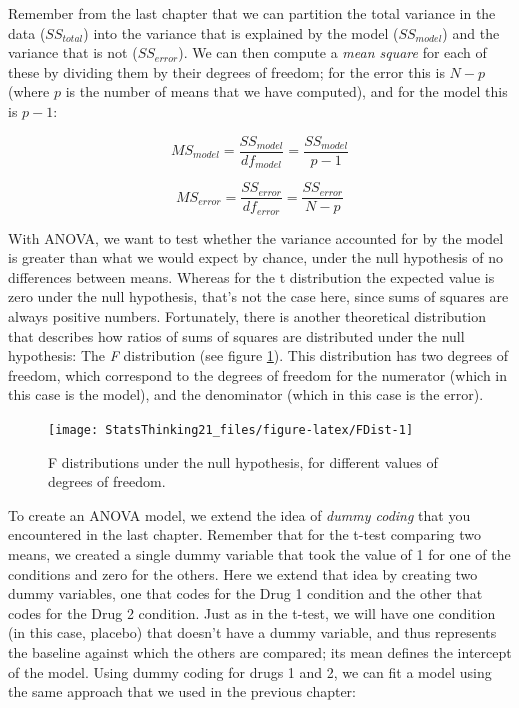 \documentclass[12pt,]{book}
\theoremstyle{definition}
\theoremstyle{definition}
\theoremstyle{definition}
\theoremstyle{remark}
\begin{document}
Remember from the last chapter that we can partition the total variance in the data (\(SS_{total}\)) into the variance that is explained by the model (\(SS_{model}\)) and the variance that is not (\(SS_{error}\)). We can then compute a \emph{mean square} for each of these by dividing them by their degrees of freedom; for the error this is \(N - p\) (where \(p\) is the number of means that we have computed), and for the model this is \(p - 1\):

\[
MS_{model} =\frac{SS_{model}}{df_{model}}= \frac{SS_{model}}{p-1}
\]

\[
MS_{error} = \frac{SS_{error}}{df_{error}} = \frac{SS_{error}}{N - p}
\]

With ANOVA, we want to test whether the variance accounted for by the model is greater than what we would expect by chance, under the null hypothesis of no differences between means. Whereas for the t distribution the expected value is zero under the null hypothesis, that's not the case here, since sums of squares are always positive numbers. Fortunately, there is another theoretical distribution that describes how ratios of sums of squares are distributed under the null hypothesis: The \emph{F} distribution (see figure \ref{fig:FDist}). This distribution has two degrees of freedom, which correspond to the degrees of freedom for the numerator (which in this case is the model), and the denominator (which in this case is the error).

\begin{figure}
\texttt{[image: StatsThinking21\_files/figure-latex/FDist-1]} \caption{F distributions under the null hypothesis, for different values of degrees of freedom.}\label{fig:FDist}
\end{figure}

To create an ANOVA model, we extend the idea of \emph{dummy coding} that you encountered in the last chapter. Remember that for the t-test comparing two means, we created a single dummy variable that took the value of 1 for one of the conditions and zero for the others. Here we extend that idea by creating two dummy variables, one that codes for the Drug 1 condition and the other that codes for the Drug 2 condition. Just as in the t-test, we will have one condition (in this case, placebo) that doesn't have a dummy variable, and thus represents the baseline against which the others are compared; its mean defines the intercept of the model. Using dummy coding for drugs 1 and 2, we can fit a model using the same approach that we used in the previous chapter:
\end{document}
